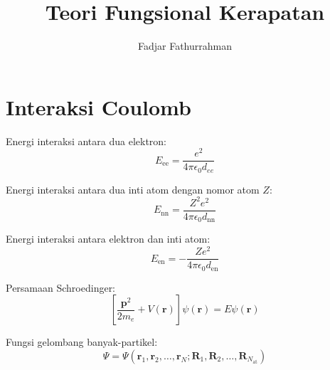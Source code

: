 \documentclass[a4paper,12pt]{article} %
\begin{document}
\title{Teori Fungsional Kerapatan}
\author{Fadjar Fathurrahman}
\date{}
\maketitle

\section{Interaksi Coulomb}

Energi interaksi antara dua elektron:
\begin{equation}
E_{\mathrm{ee}} = \frac{e^2}{4\pi\epsilon_{0}d_{ee}}
\end{equation}

Energi interaksi antara dua inti atom dengan nomor atom $Z$:
\begin{equation}
E_{\mathrm{nn}} = \frac{Z^2e^2}{4\pi\epsilon_{0}d_{\mathrm{nn}}}
\end{equation}

Energi interaksi antara elektron dan inti atom:
\begin{equation}
E_{\mathrm{en}} = -\frac{Ze^2}{4\pi\epsilon_{0}d_{\mathrm{en}}}
\end{equation}

Persamaan Schroedinger:
\begin{equation}
\left[ \frac{\mathbf{p}^2}{2m_{e}} + V(\mathbf{r}) \right] \psi(\mathbf{r}) = E\psi(\mathbf{r})
\end{equation}

Fungsi gelombang banyak-partikel:
\begin{equation}
\Psi = 
\Psi\left(\mathbf{r}_{1}, \mathbf{r}_{2}, \ldots, \mathbf{r}_{N};
\mathbf{R}_{1}, \mathbf{R}_{2},\ldots,\mathbf{R}_{N_{\mathrm{at}}}
\right)
\end{equation}



\end{document}
